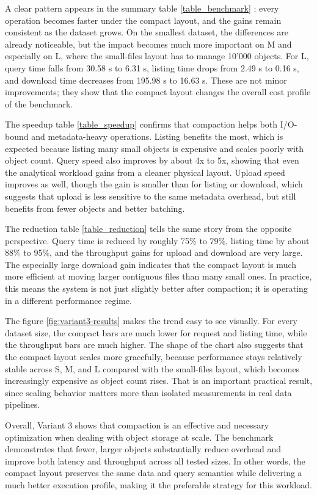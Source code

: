 \documentclass{article}
\begin{document}
A clear pattern appears in the summary table \ref{table_benchmark} : every operation becomes faster under the compact layout, and the gains remain consistent as the dataset grows. On the smallest dataset, the differences are already noticeable, but the impact becomes much more important on M and especially on L, where the small-files layout has to manage 10'000 objects. For L, query time falls from 30.58 s to 6.31 s, listing time drops from 2.49 s to 0.16 s, and download time decreases from 195.98 s to 16.63 s. These are not minor improvements; they show that the compact layout changes the overall cost profile of the benchmark.

The speedup table \ref{table_speedup} confirms that compaction helps both I/O-bound and metadata-heavy operations. Listing benefits the most, which is expected because listing many small objects is expensive and scales poorly with object count. Query speed also improves by about 4x to 5x, showing that even the analytical workload gains from a cleaner physical layout. Upload speed improves as well, though the gain is smaller than for listing or download, which suggests that upload is less sensitive to the same metadata overhead, but still benefits from fewer objects and better batching.

The reduction table \ref{table_reduction} tells the same story from the opposite perspective. Query time is reduced by roughly 75\% to 79\%, listing time by about 88\% to 95\%, and the throughput gains for upload and download are very large. The especially large download gain indicates that the compact layout is much more efficient at moving larger contiguous files than many small ones. In practice, this means the system is not just slightly better after compaction; it is operating in a different performance regime.

The figure \ref{fig:variant3-results} makes the trend easy to see visually. For every dataset size, the compact bars are much lower for request and listing time, while the throughput bars are much higher. The shape of the chart also suggests that the compact layout scales more gracefully, because performance stays relatively stable across S, M, and L compared with the small-files layout, which becomes increasingly expensive as object count rises. That is an important practical result, since scaling behavior matters more than isolated measurements in real data pipelines.

Overall, Variant 3 shows that compaction is an effective and necessary optimization when dealing with object storage at scale. The benchmark demonstrates that fewer, larger objects substantially reduce overhead and improve both latency and throughput across all tested sizes. In other words, the compact layout preserves the same data and query semantics while delivering a much better execution profile, making it the preferable strategy for this workload.
\end{document}
